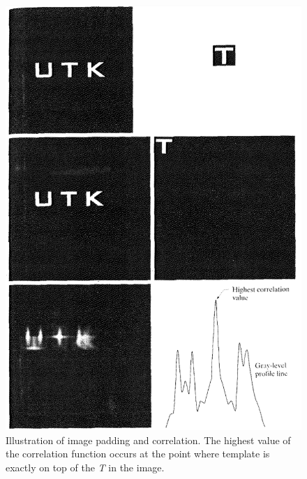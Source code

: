 \begin{figure}[!h]
	\includegraphics[width=.8\textwidth]{figure_2_1}
	\caption{Illustration of image padding and correlation. The highest value of the correlation function occurs at the point where template is exactly on top of the \textit{T} in the image.}
	\label{pl1}
\end{figure}
